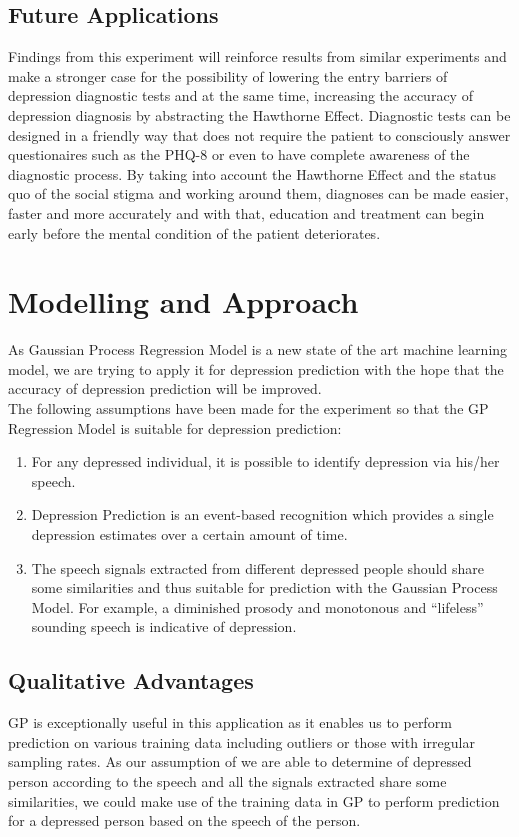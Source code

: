 \documentclass{article}
\begin{document}
	\subsection{Future Applications}
	Findings from this experiment will reinforce results from similar experiments and make a stronger case for the possibility of lowering the entry barriers of depression diagnostic tests and at the same time, increasing the accuracy of depression diagnosis by abstracting the Hawthorne Effect. 
	Diagnostic tests can be designed in a friendly way that does not require the patient to consciously answer questionaires such as the PHQ-8 or even to have complete awareness of the diagnostic process. 
	By taking into account the Hawthorne Effect and the status quo of the social stigma and working around them, diagnoses can be made easier, faster and more accurately and with that, education and treatment can begin early before the mental condition of the patient deteriorates. \\
	
	\section{Modelling and Approach}
	As Gaussian Process Regression Model is a new state of the art machine learning model, we are trying to apply it for depression prediction 
	with the hope that the accuracy of depression prediction will be improved. \\	
	
	The following assumptions have been made for the experiment so that the GP Regression Model is suitable for depression prediction:
	\begin{enumerate}
		\item For any depressed individual, it is possible to identify depression via his/her speech. \cite{Cummins2015}
		\item Depression Prediction is an event-based recognition which provides a single depression estimates over a certain amount of time. \cite{Valstar2016}
		\item The speech signals extracted from different depressed people should share some similarities and thus suitable for prediction with the Gaussian Process Model. 
		For example, a diminished prosody and monotonous and “lifeless” sounding speech is indicative of depression.\cite{Cummins2015}
	\end{enumerate}

	\subsection{Qualitative Advantages}
	GP is exceptionally useful in this application as it enables us to perform prediction on various training data including outliers or 
	those with irregular sampling rates. As our assumption of we are able to determine of depressed person according to the speech and all 
	the signals extracted share some similarities, we could make use of the training data in GP to perform prediction for a depressed person based on the speech of the person.\\
\end{document}
